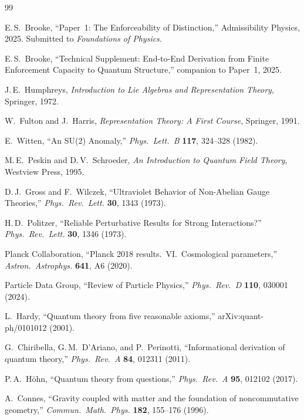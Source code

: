 \documentclass[11pt]{article}
\theoremstyle{definition}
\begin{document}
\begin{thebibliography}{99}

E.\,S.~Brooke, ``Paper~1: The Enforceability of Distinction,''
Admissibility Physics, 2025.
Submitted to \textit{Foundations of Physics}.

E.\,S.~Brooke, ``Technical Supplement: End-to-End Derivation from Finite
Enforcement Capacity to Quantum Structure,'' companion to Paper~1, 2025.

J.\,E.~Humphreys, \textit{Introduction to Lie Algebras and Representation
Theory}, Springer, 1972.

W.~Fulton and J.~Harris, \textit{Representation Theory: A First Course},
Springer, 1991.

E.~Witten, ``An SU(2) Anomaly,'' \textit{Phys.\ Lett.\ B} \textbf{117},
324--328 (1982).

M.\,E.~Peskin and D.\,V.~Schroeder, \textit{An Introduction to Quantum
Field Theory}, Westview Press, 1995.

D.\,J.~Gross and F.~Wilczek, ``Ultraviolet Behavior of Non-Abelian
Gauge Theories,'' \textit{Phys.\ Rev.\ Lett.} \textbf{30}, 1343 (1973).

H.\,D.~Politzer, ``Reliable Perturbative Results for Strong Interactions?''
\textit{Phys.\ Rev.\ Lett.} \textbf{30}, 1346 (1973).

Planck Collaboration, ``Planck 2018 results.\ VI.\ Cosmological
parameters,'' \textit{Astron.\ Astrophys.} \textbf{641}, A6 (2020).

Particle Data Group, ``Review of Particle Physics,''
\textit{Phys.\ Rev.\ D} \textbf{110}, 030001 (2024).

L.~Hardy, ``Quantum theory from five reasonable axioms,''
arXiv:quant-ph/0101012 (2001).

G.~Chiribella, G.\,M.~D'Ariano, and P.~Perinotti,
``Informational derivation of quantum theory,''
\textit{Phys.\ Rev.\ A} \textbf{84}, 012311 (2011).

P.\,A.~H\"ohn, ``Quantum theory from questions,''
\textit{Phys.\ Rev.\ A} \textbf{95}, 012102 (2017).

A.~Connes, ``Gravity coupled with matter and the foundation of
noncommutative geometry,''
\textit{Commun.\ Math.\ Phys.} \textbf{182}, 155--176 (1996).


\end{thebibliography}
\end{document}
